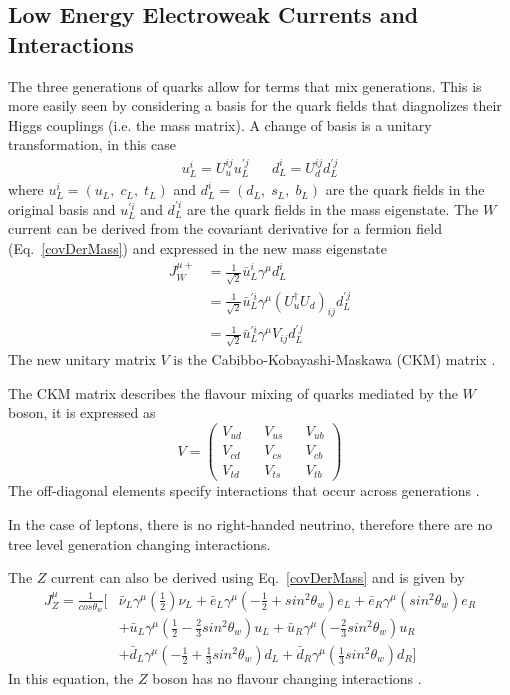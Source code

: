 \subsection{Low Energy Electroweak Currents and Interactions}

The three generations of quarks allow for terms that mix generations. This is more easily seen by considering a basis for the quark fields that diagnolizes their Higgs couplings (i.e. the mass matrix). A change of basis is a unitary transformation, in this case
\begin{align}
    u^{i}_{L}=U^{ij}_{u}u_{L}^{'j} &&
    d^{i}_{L}=U^{ij}_{d}d_{L}^{'j}
\end{align}
where $u^{i}_{L}=(u_{L},\; c_{L},\; t_{L})$ and $d^{i}_{L}=(d_{L},\; s_{L},\; b_{L})$ are the quark fields in the original basis and $u_{L}^{'i}$ and $d_{L}^{'i}$ are the quark fields in the mass eigenstate. The $W$ current can be derived from the covariant derivative for a fermion field (Eq.~\ref{covDerMass}) and expressed in the new mass eigenstate
\begin{align}
    J_{W}^{\mu +}&=\frac{1}{\sqrt{2}}\bar{u}^{i}_{L}\gamma^{\mu} d^{i}_{L} \\
    &=\frac{1}{\sqrt{2}}\bar{u}_{L}^{'i}\gamma^{\mu} (U^{\dagger}_{u}U_{d})_{ij}d_{L}^{'j} \\
    &=\frac{1}{\sqrt{2}}\bar{u}_{L}^{'i}\gamma^{\mu} V_{ij} d_{L}^{'j}
\end{align}
The new unitary matrix $V$ is the Cabibbo-Kobayashi-Maskawa (CKM) matrix \cite{Peskin}.

The CKM matrix describes the flavour mixing of quarks mediated by the $W$ boson, it is expressed as
\begin{equation}
    V =
    \begin{pmatrix}
    V_{ud} && V_{us} && V_{ub} \\
    V_{cd} && V_{cs} && V_{cb} \\
    V_{td} && V_{ts} && V_{tb} 
    \end{pmatrix}
\end{equation}
The off-diagonal elements specify interactions that occur across generations \cite{CKM}.

In the case of leptons, there is no right-handed neutrino, therefore there are no tree level generation changing interactions. 

The $Z$ current can also be derived using Eq.~\ref{covDerMass} and is given by
\begin{align*}
    J^{\mu}_{Z} = \frac{1}{cos\theta_{w}}[&\bar{\nu}_{L}\gamma^{\mu} (\frac{1}{2}) \nu_{L} + \bar{e}_{L}\gamma^{\mu}(-\frac{1}{2}+sin^{2}\theta_{w})e_{L} + \bar{e}_{R}\gamma^{\mu}(sin^{2}\theta_{w})e_{R} \\
    &+ \bar{u}_{L}\gamma^{\mu}(\frac{1}{2}-\frac{2}{3}sin^{2}\theta_{w})u_{L} + \bar{u}_{R}\gamma^{\mu}(-\frac{2}{3}sin^{2}\theta_{w})u_{R} \\
    &+ \bar{d}_{L}\gamma^{\mu}(-\frac{1}{2}+\frac{1}{3}sin^{2}\theta_{w})d_{L} + \bar{d}_{R}\gamma^{\mu}(\frac{1}{3}sin^{2}\theta_{w})d_{R}]
\end{align*}
In this equation, the $Z$ boson has no flavour changing interactions \cite{Peskin}.

